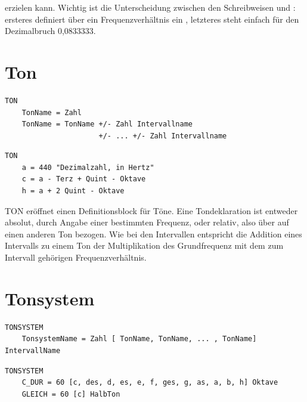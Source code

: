 erzielen kann. Wichtig ist die Unterscheidung zwischen den Schreibweisen 
 und : ersteres definiert über ein Frequenzverhältnis 
ein , letzteres steht einfach für 
den Dezimalbruch 0,0833333.


\section{Ton}
\label{sec:SX_TONE}


\begin{verbatim}
TON
    TonName = Zahl
    TonName = TonName +/- Zahl Intervallname 
                      +/- ... +/- Zahl Intervallname
\end{verbatim}




\begin{verbatim}
TON
    a = 440 "Dezimalzahl, in Hertz"
    c = a - Terz + Quint - Oktave 
    h = a + 2 Quint - Oktave
\end{verbatim}




TON eröffnet einen Definitionsblock für Töne. Eine Tondeklaration 
ist entweder absolut, durch Angabe einer bestimmten Frequenz, 
oder relativ, also über  auf einen 
anderen Ton bezogen. Wie bei den Intervallen entspricht die Addition 
eines Intervalls zu einem Ton der Multiplikation des Grundfrequenz 
mit dem zum Intervall gehörigen Frequenzverhältnis.


\section{Tonsystem}
\label{sec:SX_TONESYSTEM}



\begin{verbatim}
TONSYSTEM
    TonsystemName = Zahl [ TonName, TonName, ... , TonName] IntervallName
\end{verbatim}




\begin{verbatim}
TONSYSTEM
    C_DUR = 60 [c, des, d, es, e, f, ges, g, as, a, b, h] Oktave 
    GLEICH = 60 [c] HalbTon
\end{verbatim}




